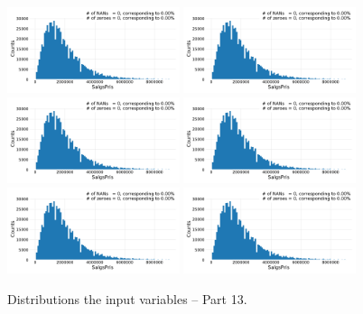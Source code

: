 \begin{figure}
  \subfloat{\qquad}
  \includegraphics[draft=false, width=0.45\textwidth, page=151, trim=15 0 15 0, clip]{figures/housing/overview_fig.pdf}\hfil
  \subfloat{\qquad}
  \includegraphics[draft=false, width=0.45\textwidth, page=152, trim=15 0 15 0, clip]{figures/housing/overview_fig.pdf}
  \subfloat{\qquad}
  \includegraphics[draft=false, width=0.45\textwidth, page=153, trim=15 0 15 0, clip]{figures/housing/overview_fig.pdf}\hfil
  \subfloat{\qquad}
  \includegraphics[draft=false, width=0.45\textwidth, page=154, trim=15 0 15 0, clip]{figures/housing/overview_fig.pdf}
  \subfloat{\qquad}
  \includegraphics[draft=false, width=0.45\textwidth, page=155, trim=15 0 15 0, clip]{figures/housing/overview_fig.pdf}\hfil
  \subfloat{\qquad}
  \includegraphics[draft=false, width=0.45\textwidth, page=156, trim=15 0 15 0, clip]{figures/housing/overview_fig.pdf}
  \caption[Distributions of the Input Variables -- Part 13]{Distributions the input variables -- Part 13.}
  \label{fig:h:variable_overview_all_13}
  \vspace{\abovecaptionskip}
\end{figure}

